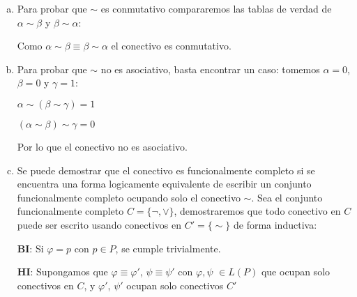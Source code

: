 \begin{enumerate}[a)]
    \item Para probar que $\sim$ es conmutativo compararemos las tablas de verdad de $\alpha \sim \beta$ y $\beta \sim \alpha$:
    
    \begin{center}
    \end{center}
    
    Como $\alpha \sim \beta \equiv \beta \sim \alpha$ el conectivo es conmutativo.
    
    \item Para probar que $\sim$ no es asociativo, basta encontrar un caso: tomemos $\alpha = 0$, $\beta = 0$ y $\gamma = 1$:
    
    \hspace{10mm} $\alpha \sim (\beta \sim \gamma) = 1$
    
    \hspace{10mm} $(\alpha \sim \beta) \sim \gamma = 0$
    
    Por lo que el conectivo no es asociativo.
    
    \item Se puede demostrar que el conectivo es funcionalmente completo si se encuentra una forma logicamente equivalente de escribir un conjunto funcionalmente completo ocupando solo el conectivo $\sim$. Sea el conjunto funcionalmente completo $C = \{\neg, \vee\}$, demostraremos que todo conectivo en $C$ puede ser escrito usando conectivos en $C' = \{\sim\}$ de forma inductiva:
    
    \textbf{BI}: Si $\varphi = p$ con $p \in P$, se cumple trivialmente.
    
    \textbf{HI}: Supongamos que $\varphi \equiv \varphi'$, $\psi \equiv \psi'$ con $\varphi, \psi$  $\in L(P)$ que ocupan solo conectivos en $C$, y $\varphi'$, $\psi'$ ocupan solo conectivos $C'$
    

\end{enumerate}
